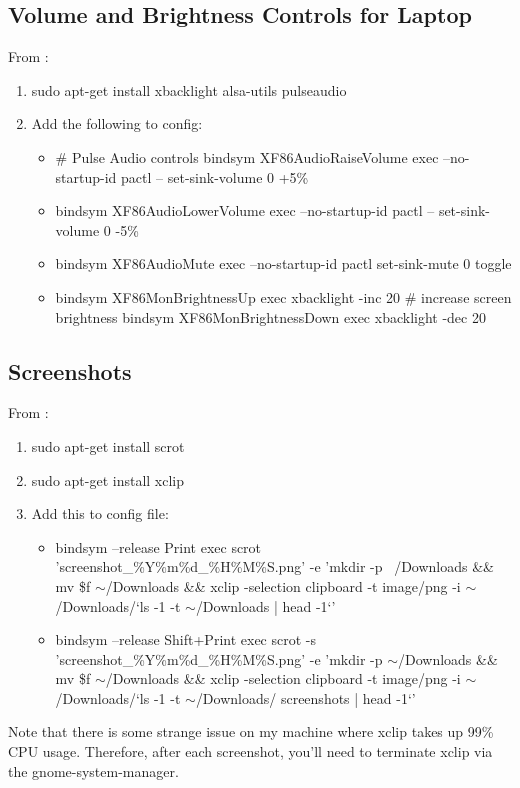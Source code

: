 \subsection{Volume and Brightness Controls for Laptop}
From \cite{quidproquo2018volume}:
\begin{enumerate}
    \item sudo apt-get install xbacklight alsa-utils pulseaudio
    \item Add the following to config:
        \begin{itemize}
            \item \# Pulse Audio controls
                bindsym XF86AudioRaiseVolume exec --no-startup-id pactl --
                set-sink-volume 0 +5\%
            \item bindsym XF86AudioLowerVolume exec --no-startup-id pactl --
                set-sink-volume 0 -5\%
            \item bindsym XF86AudioMute exec --no-startup-id pactl set-sink-mute
                0 toggle
            \item bindsym XF86MonBrightnessUp exec xbacklight -inc 20 \#
                increase screen brightness bindsym XF86MonBrightnessDown
                exec xbacklight -dec 20
        \end{itemize}
\end{enumerate}

\subsection{Screenshots}
From \cite{brainlessdeveloper2017screenshot}:
\begin{enumerate}
    \item sudo apt-get install scrot
    \item sudo apt-get install xclip
    \item Add this to config file:
        \begin{itemize}
            \item bindsym --release Print exec scrot
                'screenshot\_\%Y\%m\%d\_\%H\%M\%S.png' -e 'mkdir -p ~/Downloads
                \&\& mv \$f $\sim$/Downloads \&\& xclip -selection clipboard -t
                image/png -i $\sim$/Downloads/`ls -1 -t $\sim$/Downloads | head -1`'
            \item bindsym --release Shift+Print exec scrot -s
                'screenshot\_\%Y\%m\%d\_\%H\%M\%S.png' -e 'mkdir -p
                $\sim$/Downloads \&\& mv \$f $\sim$/Downloads \&\& xclip
                -selection clipboard -t image/png -i $\sim$/Downloads/`ls -1 -t
                $\sim$/Downloads/          screenshots | head -1`'
        \end{itemize}
\end{enumerate}
Note that there is some strange issue on my machine where xclip takes up 99\%
CPU usage. Therefore, after each screenshot, you'll need to terminate xclip via
the gnome-system-manager.

